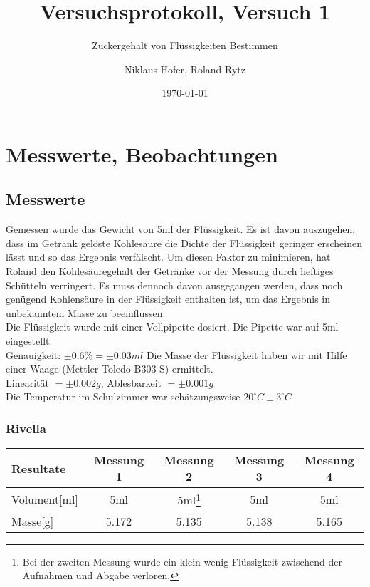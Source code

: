 \documentclass[11pt,paper=a4,final]{scrartcl}
\title{Versuchsprotokoll, Versuch 1}
\subtitle{Zuckergehalt von Fl\"ussigkeiten Bestimmen}
\author{Niklaus Hofer, Roland Rytz}
\date{\today{}}
\begin{document}
\maketitle
\newpage
\section{Messwerte, Beobachtungen}
\subsection{Messwerte}                                                
Gemessen wurde das Gewicht von 5ml der Fl\"ussigkeit. Es ist davon auszugehen, dass im Getr\"ank gel\"oste Kohles\"aure die Dichte der Fl\"ussigkeit geringer erscheinen l\"asst und so das Ergebnis verf\"alscht. Um diesen Faktor zu minimieren, hat Roland den Kohles\"auregehalt der Getr\"anke vor der Messung durch heftiges Sch\"utteln verringert. Es muss dennoch davon ausgegangen werden, dass noch gen\"ugend Kohlens\"aure in der Fl\"ussigkeit enthalten ist, um das Ergebnis in unbekanntem Masse zu beeinflussen.\\

Die Fl\"ussigkeit wurde mit einer Vollpipette dosiert. Die Pipette war auf 5ml eingestellt.\\
Genauigkeit: \(\pm0.6\% = \pm0.03ml\)\newline
Die Masse der Fl\"ussigkeit haben wir mit Hilfe einer Waage (Mettler Toledo B303-S) ermittelt.\\
Linearit\"at \( = \pm0.002g\), Ablesbarkeit \( = \pm0.001g\)\\
Die Temperatur im Schulzimmer war sch\"atzungsweise \(20^\circ C \pm 3^\circ C\)

\subsubsection{Rivella\textsuperscript{\textregistered}}
\begin{tabular}{|l|c|c|c|c|}
\hline
\bf Resultate & \bf Messung 1 & \bf Messung 2 & \bf Messung 3 & \bf Messung 4 \\ \hline
Volument[ml] & 5ml & 5ml\footnote{Bei der zweiten Messung wurde ein klein wenig Fl\"ussigkeit zwischend der Aufnahmen und Abgabe verloren.} & 5ml & 5ml \\ \hline
Masse[g]     & 5.172 & 5.135 & 5.138 & 5.165 \\ \hline
\end{tabular}
\end{document}
